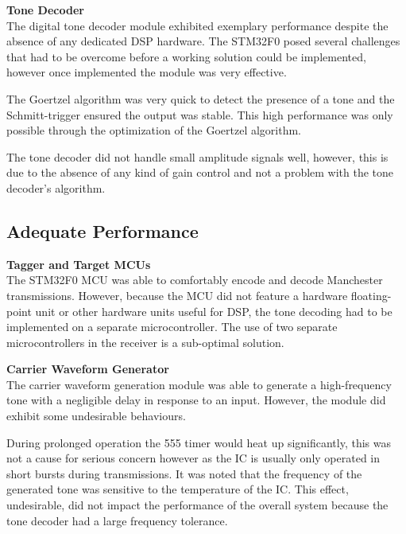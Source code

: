 \textbf{Tone Decoder}\\ %
The digital tone decoder module exhibited exemplary performance despite the absence of any dedicated DSP hardware. The STM32F0 posed several challenges that had to be overcome before a working solution could be implemented, however once implemented the module was very effective.

The Goertzel algorithm was very quick to detect the presence of a tone and the Schmitt-trigger ensured the output was stable. This high performance was only possible through the optimization of the Goertzel algorithm.

The tone decoder did not handle small amplitude signals well, however, this is due to the absence of any kind of gain control and not a problem with the tone decoder's algorithm.

\subsection{Adequate Performance}

\textbf{Tagger and Target MCUs}\\
The STM32F0 MCU was able to comfortably encode and decode Manchester transmissions. However, because the MCU did not feature a hardware floating-point unit or other hardware units useful for DSP, the tone decoding had to be implemented on a separate microcontroller. The use of two separate microcontrollers in the receiver is a sub-optimal solution.


\textbf{Carrier Waveform Generator}\\
The carrier waveform generation module was able to generate a high-frequency tone with a negligible delay in response to an input. However, the module did exhibit some undesirable behaviours.

During prolonged operation the 555 timer would heat up significantly, this was not a cause for serious concern however as the IC is usually only operated in short bursts during transmissions. It was noted that the frequency of the generated tone was sensitive to the temperature of the IC. This effect, undesirable, did not impact the performance of the overall system because the tone decoder had a large frequency tolerance. 


